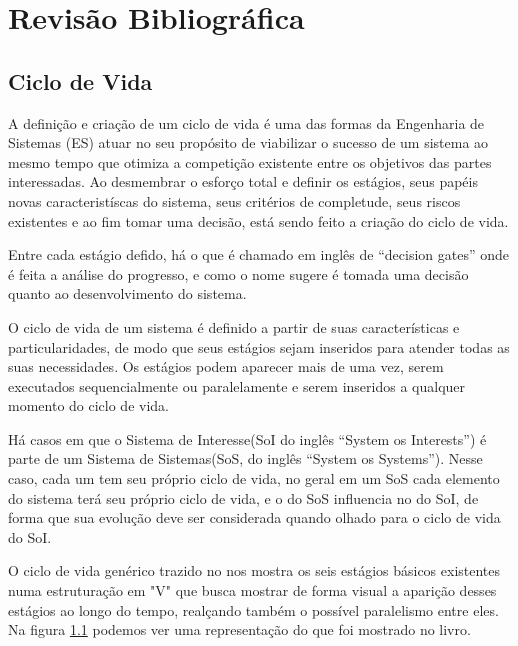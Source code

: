 
\chapter{Revisão Bibliográfica}\label{chap:revisao}

\section{Ciclo de Vida}

	A definição e criação de um ciclo de vida é uma das formas da Engenharia de Sistemas (ES) atuar no seu propósito de viabilizar o sucesso de um sistema ao
	mesmo tempo que otimiza a competição existente entre os objetivos das partes interessadas. Ao desmembrar o esforço total e definir os estágios, seus papéis novas
	caracteristíscas do sistema, seus critérios de completude, seus riscos existentes e ao fim tomar uma decisão, está sendo feito a criação do ciclo de vida.

	Entre cada estágio defido, há o que é chamado em inglês de ``decision gates'' onde é feita a análise do progresso, e como o nome sugere é tomada uma decisão
	quanto ao desenvolvimento do sistema.

	O ciclo de vida de um sistema é definido a partir de suas características e particularidades, de modo que seus estágios sejam inseridos para atender todas as suas
	necessidades. Os estágios podem aparecer mais de uma vez, serem executados sequencialmente ou paralelamente e serem inseridos a qualquer momento do ciclo de vida.

	Há casos em que o Sistema de Interesse(SoI do inglês ``System os Interests'') é parte de um Sistema de Sistemas(SoS, do inglês ``System os Systems''). Nesse caso,
	cada um tem seu próprio ciclo de vida, no geral em um SoS cada elemento do sistema terá seu próprio ciclo de vida, e o do SoS influencia no do SoI, de forma
	que sua evolução deve ser considerada quando olhado para o ciclo de vida do SoI.

	O ciclo de vida genérico trazido no \cite{incoseHandbook} nos mostra os seis estágios básicos existentes numa estruturação em "V" que busca mostrar de forma visual a aparição desses estágios
	ao longo do tempo, realçando também o possível paralelismo entre eles. Na figura \ref{} podemos ver uma representação do que foi mostrado no livro.

